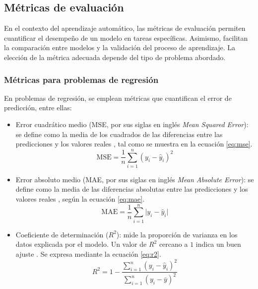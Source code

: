 \subsection{Métricas de evaluación}
\label{sec:metricas}

En el contexto del aprendizaje automático, las métricas de evaluación permiten cuantificar el desempeño de un modelo en tareas específicas. Asimismo, facilitan la comparación entre modelos y la validación del proceso de aprendizaje. La elección de la métrica adecuada depende del tipo de problema abordado.


\subsubsection{Métricas para problemas de regresión}
\label{sec:metricas_regresion}

En problemas de regresión, se emplean métricas que cuantifican el error de predicción, entre ellas:

\begin{itemize}
    \item Error cuadrático medio (MSE, por sus siglas en inglés \textit{Mean Squared Error}): se define como la media de los cuadrados de las diferencias entre las predicciones y los valores reales \cite{botchkarev2019performance}, tal como se muestra en la ecuación \eqref{eq:mse}.
    \begin{equation}
        \label{eq:mse}
        \text{MSE} = \frac{1}{n} \sum_{i=1}^{n} (y_i - \hat{y}_i)^2
    \end{equation}

    \item Error absoluto medio (MAE, por sus siglas en inglés \textit{Mean Absolute Error}): se define como la media de las diferencias absolutas entre las predicciones y los valores reales \cite{willmott2005advantages}, según la ecuación \eqref{eq:mae}.
    \begin{equation}
        \label{eq:mae}
        \text{MAE} = \frac{1}{n} \sum_{i=1}^{n} \lvert y_i - \hat{y}_i \rvert
    \end{equation}

    \item Coeficiente de determinación ($R^2$): mide la proporción de varianza en los datos explicada por el modelo. Un valor de $R^2$ cercano a $1$ indica un buen ajuste \cite{wooldridge2016econometrics}. Se expresa mediante la ecuación \eqref{eq:r2}.
    \begin{equation}
        \label{eq:r2}
        R^2 = 1 - \frac{\sum_{i=1}^{n} (y_i - \hat{y}_i)^2}{\sum_{i=1}^{n} (y_i - \bar{y})^2}
    \end{equation}
\end{itemize}

